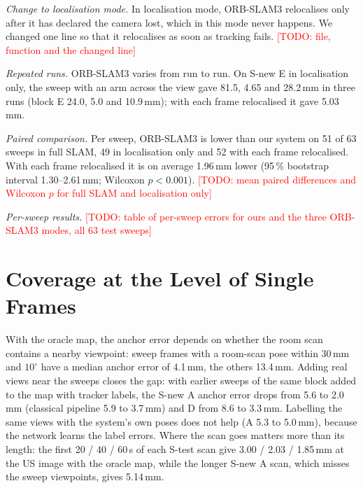 \documentclass[journal]{IEEEtran}
\newcommand{\tbd}[1]{\textcolor{red}{[TODO: #1]}}
\newcommand{\Stest}{S-test}
\newcommand{\Snew}{S-new}
\begin{document}
\emph{Change to localisation mode.} In localisation mode, ORB-SLAM3 relocalises only after it has declared the camera lost, which in this mode never happens. We changed one line so that it relocalises as soon as tracking fails. \tbd{file, function and the changed line}

\emph{Repeated runs.} ORB-SLAM3 varies from run to run. On \Snew{} E in localisation only, the sweep with an arm across the view gave 81.5, 4.65 and 28.2\,mm in three runs (block E 24.0, 5.0 and 10.9\,mm); with each frame relocalised it gave 5.03\,mm.

\emph{Paired comparison.} Per sweep, ORB-SLAM3 is lower than our system on 51 of 63 sweeps in full SLAM, 49 in localisation only and 52 with each frame relocalised. With each frame relocalised it is on average 1.96\,mm lower (95\,\% bootstrap interval 1.30--2.61\,mm; Wilcoxon $p<0.001$). \tbd{mean paired differences and Wilcoxon $p$ for full SLAM and localisation only}

\emph{Per-sweep results.} \tbd{table of per-sweep errors for ours and the three ORB-SLAM3 modes, all 63 test sweeps}

\section{Coverage at the Level of Single Frames}
\label{sec:s_frames}
With the oracle map, the anchor error depends on whether the room scan contains a nearby viewpoint: sweep frames with a room-scan pose within 30\,mm and $10^\circ$ have a median anchor error of 4.1\,mm, the others 13.4\,mm. Adding real views near the sweeps closes the gap: with earlier sweeps of the same block added to the map with tracker labels, the \Snew{} A anchor error drops from 5.6 to 2.0\,mm (classical pipeline 5.9 to 3.7\,mm) and D from 8.6 to 3.3\,mm. Labelling the same views with the system's own poses does not help (A 5.3 to 5.0\,mm), because the network learns the label errors. Where the scan goes matters more than its length: the first 20 / 40 / 60\,s of each \Stest{} scan give 3.00 / 2.03 / 1.85\,mm at the US image with the oracle map, while the longer \Snew{} A scan, which misses the sweep viewpoints, gives 5.14\,mm.



\end{document}
